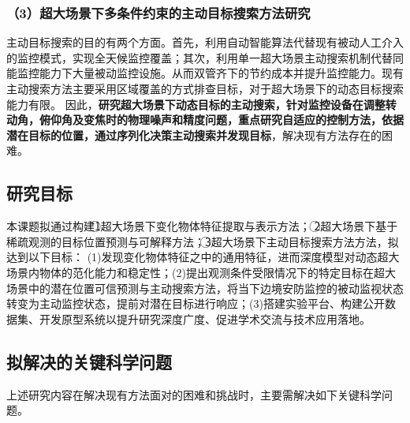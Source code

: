 \subsubsection*{\bfseries （3）超大场景下多条件约束的主动目标搜索方法研究}

主动目标搜索的目的有两个方面。首先，利用自动智能算法代替现有被动人工介入的监控模式，实现全天候监控覆盖；其次，利用单一超大场景主动搜索机制代替同能监控能力下大量被动监控设施。从而双管齐下的节约成本并提升监控能力。现有主动搜索方法主要采用区域覆盖的方式排查目标，对于超大场景下的动态目标搜索能力有限。
因此，\textbf{研究超大场景下动态目标的主动搜索，针对监控设备在调整转动角，俯仰角及变焦时的物理噪声和精度问题，重点研究自适应的控制方法，依据潜在目标的位置，通过序列化决策主动搜索并发现目标}，解决现有方法存在的困难。


\subsection{研究目标}

本课题拟通过构建\textcircled{1}超大场景下变化物体特征提取与表示方法；
\textcircled{2}超大场景下基于稀疏观测的目标位置预测与可解释方法；\textcircled{3}超大场景下主动目标搜索方法方法，拟达到以下目标：
(1)发现变化物体特征之中的通用特征，进而深度模型对动态超大场景内物体的范化能力和稳定性；(2)提出观测条件受限情况下的特定目标在超大场景中的潜在位置可信预测与主动搜索方法，将当下边境安防监控的被动监视状态转变为主动监控状态，提前对潜在目标进行响应；(3)搭建实验平台、构建公开数据集、开发原型系统以提升研究深度广度、促进学术交流与技术应用落地。

\subsection{拟解决的关键科学问题}

上述研究内容在解决现有方法面对的困难和挑战时，主要需解决如下关键科学问题。


